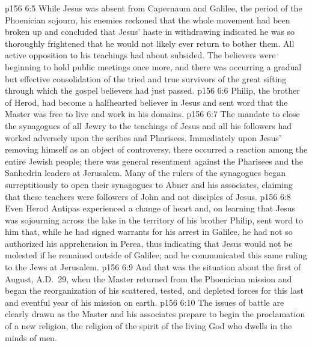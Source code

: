 \pc \vs p156 6:5 While Jesus was absent from Capernaum and Galilee, the period of the Phoenician sojourn, his enemies reckoned that the whole movement had been broken up and concluded that Jesus’ haste in withdrawing indicated he was so thoroughly frightened that he would not likely ever return to bother them. All active opposition to his teachings had about subsided. The believers were beginning to hold public meetings once more, and there was occurring a gradual but effective consolidation of the tried and true survivors of the great sifting through which the gospel believers had just passed.
\vs p156 6:6 Philip, the brother of Herod, had become a halfhearted believer in Jesus and sent word that the Master was free to live and work in his domains.
\vs p156 6:7 The mandate to close the synagogues of all Jewry to the teachings of Jesus and all his followers had worked adversely upon the scribes and Pharisees. Immediately upon Jesus’ removing himself as an object of controversy, there occurred a reaction among the entire Jewish people; there was general resentment against the Pharisees and the Sanhedrin leaders at Jerusalem. Many of the rulers of the synagogues began surreptitiously to open their synagogues to Abner and his associates, claiming that these teachers were followers of John and not disciples of Jesus.
\vs p156 6:8 Even Herod Antipas experienced a change of heart and, on learning that Jesus was sojourning across the lake in the territory of his brother Philip, sent word to him that, while he had signed warrants for his arrest in Galilee, he had not so authorized his apprehension in Perea, thus indicating that Jesus would not be molested if he remained outside of Galilee; and he communicated this same ruling to the Jews at Jerusalem.
\vs p156 6:9 And that was the situation about the first of August, A.D.~29, when the Master returned from the Phoenician mission and began the reorganization of his scattered, tested, and depleted forces for this last and eventful year of his mission on earth.
\vs p156 6:10 The issues of battle are clearly drawn as the Master and his associates prepare to begin the proclamation of a new religion, the religion of the spirit of the living God who dwells in the minds of men.
